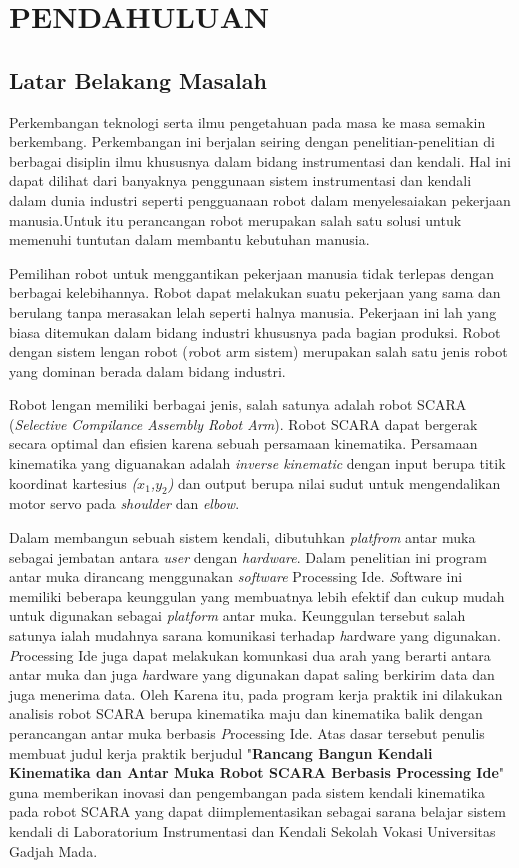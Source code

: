 
\chapter{PENDAHULUAN}

\section{Latar Belakang Masalah}

	Perkembangan teknologi serta ilmu pengetahuan pada masa ke masa semakin berkembang. Perkembangan ini berjalan seiring dengan penelitian-penelitian di berbagai disiplin ilmu khususnya dalam bidang instrumentasi dan kendali. Hal ini dapat dilihat dari banyaknya penggunaan sistem instrumentasi dan kendali dalam dunia industri seperti pengguanaan robot dalam menyelesaiakan pekerjaan manusia.Untuk itu perancangan robot merupakan salah satu solusi untuk memenuhi tuntutan dalam membantu kebutuhan manusia.
	
	Pemilihan robot untuk menggantikan pekerjaan manusia tidak terlepas dengan berbagai kelebihannya. Robot dapat melakukan suatu pekerjaan yang sama dan berulang tanpa merasakan lelah seperti halnya manusia. Pekerjaan ini lah yang biasa ditemukan dalam bidang industri khususnya pada bagian produksi. Robot dengan sistem lengan robot (\emph robot arm sistem) merupakan salah satu jenis robot yang dominan berada dalam bidang industri. 
	
	Robot lengan memiliki berbagai jenis, salah satunya adalah robot SCARA (\emph{Selective Compilance Assembly Robot Arm}). Robot SCARA dapat bergerak secara optimal dan efisien karena sebuah persamaan kinematika. Persamaan kinematika yang diguanakan adalah \textit{inverse kinematic} dengan input berupa titik koordinat kartesius \textit{($x_{1}$,$y_{2}$)} dan output berupa nilai sudut untuk mengendalikan motor servo pada \textit{shoulder} dan \textit{elbow}.
	
	Dalam membangun sebuah sistem kendali, dibutuhkan \textit{platfrom} antar muka sebagai jembatan antara \textit{user} dengan \textit{hardware}. Dalam penelitian ini program antar muka dirancang menggunakan \textit{software} Processing Ide. \emph Software ini memiliki beberapa keunggulan yang membuatnya lebih efektif dan cukup mudah untuk digunakan sebagai \textit{platform} antar muka. Keunggulan tersebut salah satunya ialah mudahnya sarana komunikasi terhadap \emph hardware yang digunakan. \emph Processing Ide juga dapat melakukan komunkasi dua arah yang berarti antara antar muka dan juga \emph hardware yang digunakan dapat saling berkirim data dan juga menerima data.
	Oleh Karena itu, pada program kerja praktik ini dilakukan analisis robot SCARA berupa kinematika maju dan kinematika balik dengan perancangan antar muka berbasis \emph Processing Ide. Atas dasar tersebut penulis membuat judul kerja praktik berjudul "\textbf{Rancang Bangun Kendali Kinematika dan Antar Muka Robot SCARA Berbasis Processing Ide}" guna memberikan inovasi dan pengembangan pada sistem kendali kinematika pada robot SCARA yang dapat diimplementasikan sebagai sarana belajar sistem kendali di Laboratorium Instrumentasi dan Kendali Sekolah Vokasi Universitas Gadjah Mada.\\



